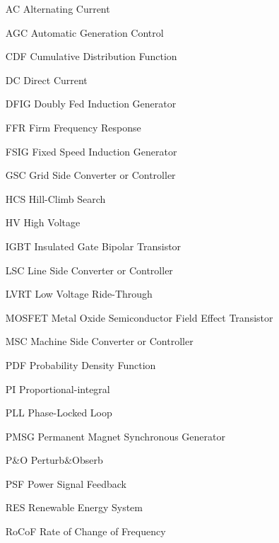 \begin{glossary}{}

\begin{itemize}[leftmargin=4.5em,align=parleft,labelsep=1cm]
	
\item[AC] Alternating Current
\item[AGC] Automatic Generation Control
\item[CDF] Cumulative Distribution Function
\item[DC] Direct Current
\item[DFIG] Doubly Fed Induction Generator
\item[FFR] Firm Frequency Response
\item[FSIG] Fixed Speed Induction Generator
\item[GSC] Grid Side Converter or Controller
\item[HCS] Hill-Climb Search
\item[HV] High Voltage
\item[IGBT] Insulated Gate Bipolar Transistor
\item[LSC] Line Side Converter or Controller
\item[LVRT] Low Voltage Ride-Through
\item[MOSFET] Metal Oxide Semiconductor Field Effect Transistor
\item[MSC] Machine Side Converter or Controller
\item[PDF] Probability Density Function
\item[PI] Proportional-integral
\item[PLL] Phase-Locked Loop
\item[PMSG] Permanent Magnet Synchronous Generator
\item[P\&O] Perturb\&Obserb
\item[PSF] Power Signal Feedback
\item[RES] Renewable Energy System
\item[RoCoF] Rate of Change of Frequency

\end{itemize}

\end{glossary}

